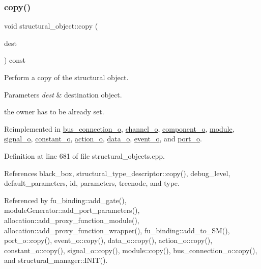 \subsubsection{\texorpdfstring{copy()}{copy()}}
{\footnotesize\ttfamily void structural\+\_\+object\+::copy (\begin{DoxyParamCaption}\item[{\hyperlink{structural__objects_8hpp_a8ea5f8cc50ab8f4c31e2751074ff60b2}{structural\+\_\+object\+Ref}}]{dest }\end{DoxyParamCaption}) const\hspace{0.3cm}{\ttfamily [virtual]}}



Perform a copy of the structural object. 


\begin{DoxyParams}{Parameters}
{\em dest} & destination object. \\
\hline
\end{DoxyParams}
the owner has to be already set. 

Reimplemented in \hyperlink{classbus__connection__o_a67b9b2ec30278115a9c545fa082c633b}{bus\+\_\+connection\+\_\+o}, \hyperlink{classchannel__o_a1e97d51670c7209f2666fdc5431a40a3}{channel\+\_\+o}, \hyperlink{classcomponent__o_abdd94a898eec3592371908dbe9ade6b4}{component\+\_\+o}, \hyperlink{classmodule_ac19167af53d30fe69ccc16881cd61425}{module}, \hyperlink{classsignal__o_a9d35d1b08d9dd1f0945f9481e88d5a5b}{signal\+\_\+o}, \hyperlink{classconstant__o_a658c0b11683baa33746bb8ed5e0f238c}{constant\+\_\+o}, \hyperlink{classaction__o_ad43a70b3b57e4ce60508ad0ee04396ff}{action\+\_\+o}, \hyperlink{classdata__o_a63d272f750a9374710c1bc8a8d06e83c}{data\+\_\+o}, \hyperlink{classevent__o_acdd317b74f63cf9e7c5fe01aa5bbeb39}{event\+\_\+o}, and \hyperlink{structport__o_a6450d734ab8d67ff5ab6305a09e95a7e}{port\+\_\+o}.



Definition at line 681 of file structural\+\_\+objects.\+cpp.



References black\+\_\+box, structural\+\_\+type\+\_\+descriptor\+::copy(), debug\+\_\+level, default\+\_\+parameters, id, parameters, treenode, and type.



Referenced by fu\+\_\+binding\+::add\+\_\+gate(), module\+Generator\+::add\+\_\+port\+\_\+parameters(), allocation\+::add\+\_\+proxy\+\_\+function\+\_\+module(), allocation\+::add\+\_\+proxy\+\_\+function\+\_\+wrapper(), fu\+\_\+binding\+::add\+\_\+to\+\_\+\+S\+M(), port\+\_\+o\+::copy(), event\+\_\+o\+::copy(), data\+\_\+o\+::copy(), action\+\_\+o\+::copy(), constant\+\_\+o\+::copy(), signal\+\_\+o\+::copy(), module\+::copy(), bus\+\_\+connection\+\_\+o\+::copy(), and structural\+\_\+manager\+::\+I\+N\+I\+T().


